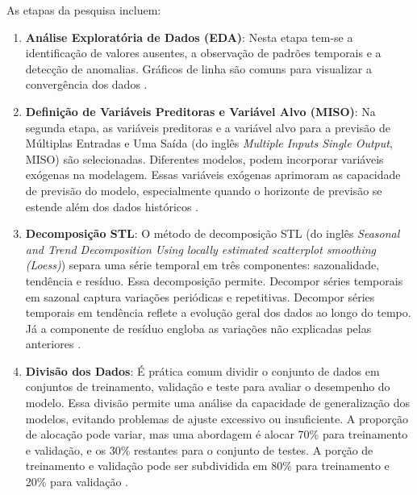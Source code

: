 \noindent As etapas da pesquisa incluem:
\begin{enumerate}[start=1, label={\textbf{Etapa} \arabic*}]
	
	\item \label{etp:1} \textbf{Análise Exploratória de Dados (EDA)}: Nesta etapa  tem-se a identificação de valores ausentes, a observação de padrões temporais e a detecção de anomalias. Gráficos de linha são comuns para visualizar a convergência dos dados \cite{Rostam2021108249}.
	
	\item \label{etp:2} \textbf{Definição de Variáveis Preditoras e Variável Alvo (MISO)}: Na segunda etapa, as variáveis preditoras e a variável alvo para a previsão de Múltiplas Entradas e Uma Saída (do inglês\textit{ Multiple Inputs Single Output}, MISO) são selecionadas. Diferentes modelos, podem incorporar variáveis exógenas na modelagem. Essas variáveis exógenas aprimoram as capacidade de previsão do modelo, especialmente quando o horizonte de previsão se estende além dos dados históricos \cite{PAWLOWSKI202298}. 
	
	\item \label{etp:3} \textbf{Decomposição STL}: O método de decomposição STL (do inglês \textit{Seasonal and Trend Decomposition Using locally estimated scatterplot smoothing (Loess)}) separa uma série temporal em três componentes: sazonalidade, tendência e resíduo. Essa decomposição permite. Decompor séries temporais em sazonal captura variações periódicas e repetitivas. Decompor séries temporais em tendência reflete a evolução geral dos dados ao longo do tempo. Já a componente de resíduo engloba as variações não explicadas pelas anteriores \cite{Bandara2021}.
	
	\item \label{etp:4} \textbf{Divisão dos Dados}: É prática comum dividir o conjunto de dados em conjuntos de treinamento, validação e teste para avaliar o desempenho do modelo. Essa divisão permite uma análise da capacidade de generalização dos modelos, evitando problemas de ajuste excessivo ou insuficiente. A proporção de alocação pode variar, mas uma abordagem é alocar 70\% para treinamento e validação, e os 30\% restantes para o conjunto de testes. A porção de treinamento e validação pode ser subdividida em 80\% para treinamento e 20\% para validação \cite{Tao2020}.
	

\end{enumerate}
